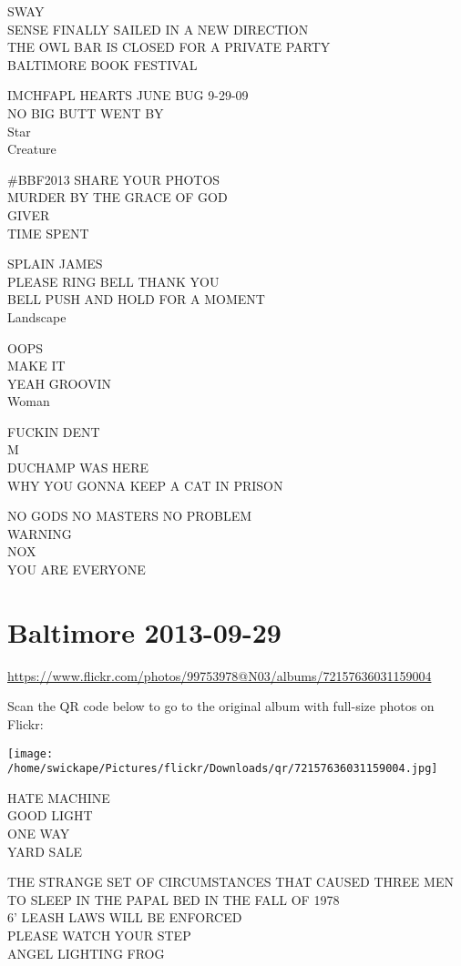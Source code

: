 \documentclass[10pt,letterpaper]{article}
\begin{document}
SWAY\\
SENSE FINALLY SAILED IN A NEW DIRECTION\\
THE OWL BAR IS CLOSED FOR A PRIVATE PARTY\\
BALTIMORE BOOK FESTIVAL

IMCHFAPL HEARTS JUNE BUG 9{-}29{-}09\\
NO BIG BUTT WENT BY\\
Star\\
Creature

\#BBF2013 SHARE YOUR PHOTOS\\
MURDER BY THE GRACE OF GOD\\
GIVER\\
TIME SPENT

SPLAIN JAMES\\
PLEASE RING BELL THANK YOU\\
BELL PUSH AND HOLD FOR A MOMENT\\
Landscape

OOPS\\
MAKE IT\\
YEAH GROOVIN\\
Woman

FUCKIN DENT\\
M\\
DUCHAMP WAS HERE\\
WHY YOU GONNA KEEP A CAT IN PRISON

NO GODS NO MASTERS NO PROBLEM\\
WARNING\\
NOX\\
YOU ARE EVERYONE


\section*{Baltimore 2013-09-29}

\url{https://www.flickr.com/photos/99753978@N03/albums/72157636031159004}

Scan the QR code below to go to the original album with full-size photos on Flickr:

\texttt{[image: /home/swickape/Pictures/flickr/Downloads/qr/72157636031159004.jpg]}


HATE MACHINE\\
GOOD LIGHT\\
ONE WAY\\
YARD SALE

THE STRANGE SET OF CIRCUMSTANCES THAT CAUSED THREE MEN TO SLEEP IN THE PAPAL BED IN THE FALL OF 1978\\
6' LEASH LAWS WILL BE ENFORCED\\
PLEASE WATCH YOUR STEP\\
ANGEL LIGHTING FROG
\end{document}
